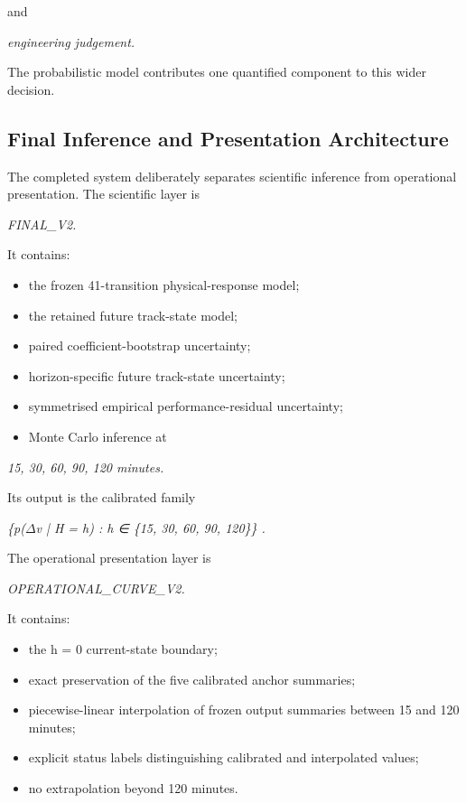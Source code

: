 and

\begin{center}\textit{engineering judgement.}\end{center}

The probabilistic model contributes one quantified component to this wider decision.

\subsection{Final Inference and Presentation Architecture}
The completed system deliberately separates scientific inference from operational presentation. The scientific layer is

\begin{center}\textit{FINAL\_V2.}\end{center}

It contains:

\begin{itemize}
\item the frozen 41-transition physical-response model;
\item the retained future track-state model;
\item paired coefficient-bootstrap uncertainty;
\item horizon-specific future track-state uncertainty;
\item symmetrised empirical performance-residual uncertainty;
\item Monte Carlo inference at
\end{itemize}

\begin{center}\textit{15, 30, 60, 90, 120 minutes.}\end{center}

Its output is the calibrated family

\begin{center}\textit{\{p(\ensuremath{\Delta}v | H = h) : h ∈ \{15, 30, 60, 90, 120\}\} .}\end{center}

The operational presentation layer is

\begin{center}\textit{OPERATIONAL\_CURVE\_V2.}\end{center}

It contains:

\begin{itemize}
\item the h = 0 current-state boundary;
\item exact preservation of the five calibrated anchor summaries;
\item piecewise-linear interpolation of frozen output summaries between 15 and 120 minutes;
\item explicit status labels distinguishing calibrated and interpolated values;
\item no extrapolation beyond 120 minutes.
\end{itemize}

